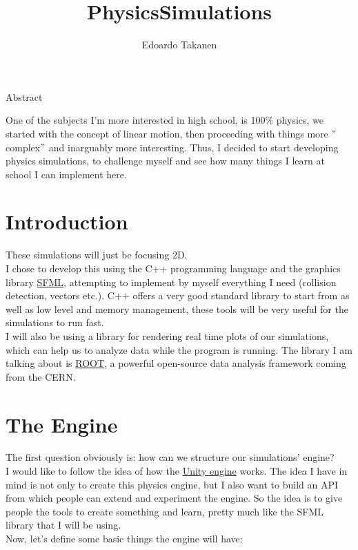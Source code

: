 \documentclass{article}
\title{PhysicsSimulations}
\author{Edoardo Takanen}
\date{}
\begin{document}
    \maketitle

    \begin{center}
        \LARGE Abstract
    \end{center}

    One of the subjects I'm more interested in high school, is 100\% physics,
    we started with the concept of linear motion, then proceeding with things more \("\)complex\("\) and inarguably more interesting.
    Thus, I decided to start developing physics simulations, to challenge myself and see how many things I learn at school I can implement here.

    \newpage
    \tableofcontents

    \newpage

    \section{Introduction}\label{sec:introduction}

    These simulations will just be focusing 2D.\\
    I chose to develop this using the C++ programming language and the graphics library \href{https://www.sfml-dev.org/}{SFML}, attempting to implement by myself everything I need (collision detection, vectors etc.).
    C++ offers a very good standard library to start from as well as low level and memory management, these tools
    will be very useful for the simulations to run fast.\\
    I will also be using a library for rendering real time plots of our simulations, which can help us to analyze data while the program is running.
    The library I am talking about is \href{https://root.cern/}{ROOT},
    a powerful open-source data analysis framework coming from the CERN\@.

    \newpage

    \section{The Engine}\label{sec:the-engine}

    The first question obviously is: how can we structure our simulations' engine?\\
    I would like to follow the idea of how the \href{https://unity.com/}{Unity engine} works.
    The idea I have in mind is not only to create this physics engine, but I also want to build an API
    from which people can extend and experiment the engine.
    So the idea is to give people the tools to create something and learn, pretty much like the SFML library that I will be using.\\
    Now, let's define some basic things the engine will have:
\end{document}
